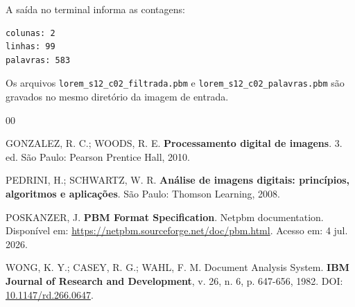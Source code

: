 \documentclass[12pt, a4paper]{article}
\begin{document}
A saída no terminal informa as contagens:

\begin{verbatim}
colunas: 2
linhas: 99
palavras: 583
\end{verbatim}

Os arquivos \texttt{lorem\_s12\_c02\_filtrada.pbm} e \texttt{lorem\_s12\_c02\_palavras.pbm} são gravados no mesmo diretório da imagem de entrada.

\newpage
{}
{}
\renewcommand{\refname}{\centering REFERÊNCIAS}
\begin{thebibliography}{00}

GONZALEZ, R. C.; WOODS, R. E. \textbf{Processamento digital de imagens}. 3. ed. São Paulo: Pearson Prentice Hall, 2010.

PEDRINI, H.; SCHWARTZ, W. R. \textbf{Análise de imagens digitais: princípios, algoritmos e aplicações}. São Paulo: Thomson Learning, 2008.

POSKANZER, J. \textbf{PBM Format Specification}. Netpbm documentation. Disponível em: \url{https://netpbm.sourceforge.net/doc/pbm.html}. Acesso em: 4 jul. 2026.

WONG, K. Y.; CASEY, R. G.; WAHL, F. M. Document Analysis System. \textbf{IBM Journal of Research and Development}, v. 26, n. 6, p. 647-656, 1982. DOI: \href{https://doi.org/10.1147/rd.266.0647}{10.1147/rd.266.0647}.

\end{thebibliography}
\end{document}
